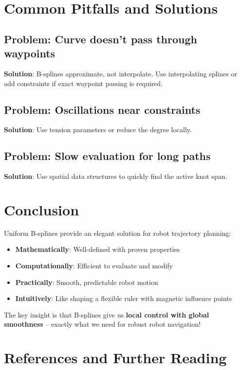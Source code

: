 \documentclass[12pt,a4paper]{article}
\begin{document}
\section{Common Pitfalls and Solutions}

\subsection{Problem: Curve doesn't pass through waypoints}
\textbf{Solution}: B-splines approximate, not interpolate. Use interpolating splines or add constraints if exact waypoint passing is required.

\subsection{Problem: Oscillations near constraints}
\textbf{Solution}: Use tension parameters or reduce the degree locally.

\subsection{Problem: Slow evaluation for long paths}
\textbf{Solution}: Use spatial data structures to quickly find the active knot span.

\section{Conclusion}

Uniform B-splines provide an elegant solution for robot trajectory planning:
\begin{itemize}
    \item \textbf{Mathematically}: Well-defined with proven properties
    \item \textbf{Computationally}: Efficient to evaluate and modify
    \item \textbf{Practically}: Smooth, predictable robot motion
    \item \textbf{Intuitively}: Like shaping a flexible ruler with magnetic influence points
\end{itemize}

The key insight is that B-splines give us \textbf{local control with global smoothness} -- exactly what we need for robust robot navigation!

\section{References and Further Reading}
\end{document}
